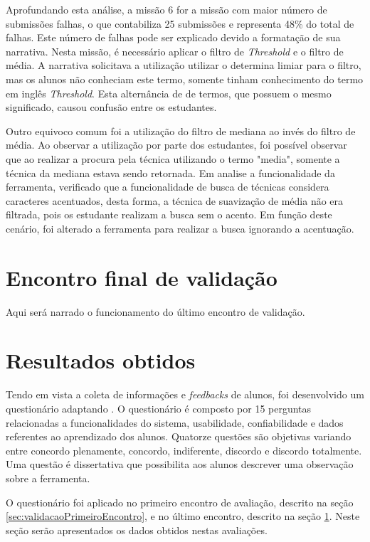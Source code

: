 \documentclass[
	12pt,				%
	oneside,			%
	a4paper,			%
	english,			%
	french,				%
	spanish,			%
	brazil,				%
	]{abntex2}
\begin{document}
Aprofundando esta análise, a missão 6 for a missão com maior número de submissões falhas, o que contabiliza 25 submissões e representa 48\% do total de falhas. Este número de falhas pode ser explicado devido a formatação de sua narrativa. Nesta missão, é necessário aplicar o filtro de \textit{Threshold} e o filtro de média. A narrativa solicitava a utilização utilizar o determina limiar para o filtro, mas os alunos não conheciam este termo, somente tinham conhecimento do termo em inglês \textit{Threshold}. Esta alternância de de termos, que possuem o mesmo significado, causou confusão entre os estudantes. 

Outro equivoco comum foi a utilização do filtro de mediana ao invés do filtro de média. Ao observar a utilização por parte dos estudantes, foi possível observar que ao realizar a procura pela técnica utilizando o termo "media", somente a técnica da mediana estava sendo retornada. Em analise a funcionalidade da ferramenta, verificado que a funcionalidade de busca de técnicas considera caracteres acentuados, desta forma, a técnica de suavização de média não era filtrada, pois os estudante realizam a busca sem o acento. Em função deste cenário, foi alterado a ferramenta para realizar a busca ignorando a acentuação. 

\section{Encontro final de validação}
\label{sec:validacaoEncontroFinal}

Aqui será narrado o funcionamento do último encontro de validação.

\section{Resultados obtidos}
\label{sec:resultadosObtidos}

Tendo em vista a coleta de informações e \textit{feedbacks} de alunos, foi desenvolvido um questionário adaptando \cite{bez2013}. O questionário é composto por 15 perguntas relacionadas a funcionalidades do sistema, usabilidade, confiabilidade e dados referentes ao aprendizado dos alunos. Quatorze questões são objetivas variando entre concordo plenamente, concordo, indiferente, discordo e discordo totalmente. Uma questão é dissertativa que possibilita aos alunos descrever uma observação sobre a ferramenta.

O questionário foi aplicado no primeiro encontro de avaliação, descrito na seção \ref{sec:validacaoPrimeiroEncontro}, e no último encontro, descrito na seção \ref{sec:validacaoEncontroFinal}. Neste seção serão apresentados os dados obtidos nestas avaliações.
\end{document}
